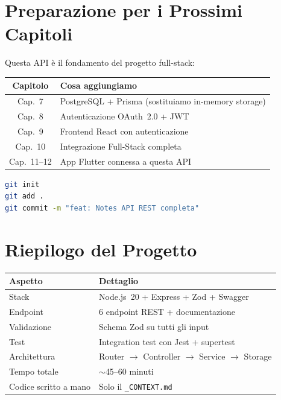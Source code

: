 \section{Preparazione per i Prossimi Capitoli}

Questa API è il fondamento del progetto full-stack:

\begin{center}
\begin{tabularx}{\textwidth}{c X}
\toprule
\textbf{Capitolo} & \textbf{Cosa aggiungiamo} \\
\midrule
Cap.~7 & PostgreSQL + Prisma (sostituiamo in-memory storage) \\
Cap.~8 & Autenticazione OAuth~2.0 + JWT \\
Cap.~9 & Frontend React con autenticazione \\
Cap.~10 & Integrazione Full-Stack completa \\
Cap.~11--12 & App Flutter connessa a questa API \\
\bottomrule
\end{tabularx}
\end{center}

\begin{praticabox}[title={Pratica --- Inizializza Git}]
\begin{lstlisting}[language=bash]
git init
git add .
git commit -m "feat: Notes API REST completa"
\end{lstlisting}
\end{praticabox}

\section*{Riepilogo del Progetto}

\begin{center}
\begin{tabularx}{\textwidth}{l X}
\toprule
\textbf{Aspetto} & \textbf{Dettaglio} \\
\midrule
Stack & Node.js~20 + Express + Zod + Swagger \\
Endpoint & 6 endpoint REST + documentazione \\
Validazione & Schema Zod su tutti gli input \\
Test & Integration test con Jest + supertest \\
Architettura & Router $\rightarrow$ Controller $\rightarrow$ Service $\rightarrow$ Storage \\
Tempo totale & $\sim$45--60 minuti \\
Codice scritto a mano & Solo il \texttt{\_CONTEXT.md} \\
\bottomrule
\end{tabularx}
\end{center}
